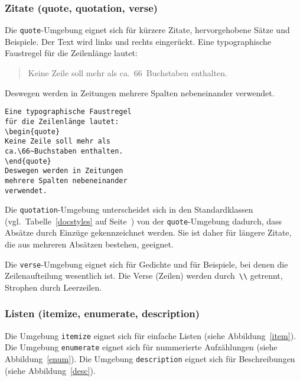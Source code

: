 \subsubsection{Zitate (quote, quotation, verse)}
 
Die \texttt{quote}-Umgebung eignet sich für kürzere Zitate,
hervorgehobene Sätze und Beispiele.
Der Text wird links und rechts eingerückt.
\exa
Eine typographische Faustregel
für die Zeilenlänge lautet:
\begin{quote}

Keine Zeile soll mehr als
ca.\ 66~Buchstaben enthalten.
\end{quote}
Deswegen werden in Zeitungen
mehrere Spalten nebeneinander
verwendet.
\exb 
\begin{verbatim}
Eine typographische Faustregel
für die Zeilenlänge lautet:
\begin{quote}
Keine Zeile soll mehr als
ca.\66~Buchstaben enthalten.
\end{quote}
Deswegen werden in Zeitungen
mehrere Spalten nebeneinander
verwendet.
\end{verbatim}
\exc

Die \texttt{quotation}-Umgebung unterscheidet sich in den
Standardklassen (vgl.\ Tabelle~\ref{docstyles} auf
Seite~\pageref{docstyles}) von der \texttt{quote}-Umgebung
dadurch, dass Absätze durch Einzüge gekennzeichnet werden.
Sie ist daher für längere Zitate, die aus mehreren Absätzen
bestehen, geeignet.

Die \texttt{verse}-Umgebung eignet sich für Gedichte und für
Beispiele, bei denen die Zeilenaufteilung wesentlich ist.  Die
Verse (Zeilen) werden durch~\verb|\\| getrennt, Strophen durch
Leerzeilen.


\subsubsection{Listen (itemize, enumerate, description)}
Die Umgebung \texttt{itemize} eignet sich für einfache Listen
(siehe Abbildung~\ref{item}).
Die Umgebung \texttt{enumerate} eignet sich für nummerierte
Aufzählungen (siehe Abbildung~\ref{enum}).
Die Umgebung \texttt{description} eignet sich für Beschreibungen
(siehe Abbildung~\ref{desc}).

